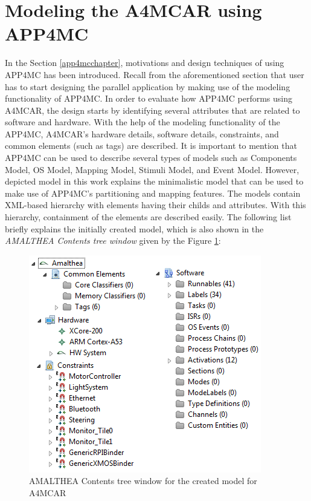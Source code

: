 \section{Modeling the A4MCAR using APP4MC}
In the Section \ref{app4mcchapter}, motivations and design techniques of using APP4MC has been introduced. Recall from the aforementioned section that user has to start designing the parallel application by making use of the modeling functionality of APP4MC. In order to evaluate how APP4MC performs using A4MCAR, the design starts by identifying several attributes that are related to software and hardware. With the help of the modeling functionality of the APP4MC, A4MCAR's hardware details, software details, constraints, and common elements (such as tags) are described. It is important to mention that APP4MC can be used to describe several types of models such as Components Model, OS Model, Mapping Model, Stimuli Model, and Event Model. However, depicted model in this work explains the minimalistic model that can be used to make use of APP4MC's partitioning and mapping features. The models contain XML-based hierarchy with elements having their childs and attributes. With this hierarchy, containment of the elements are described easily. The following list briefly explains the initially created model, which is also shown in the \textit{AMALTHEA Contents tree window} given by the Figure \ref{fig:overallmodel}:
\begin{figure}[!ht]
	\centering
	\captionsetup{justification=centering}
	\includegraphics[scale=0.8]{content/images/overallmodel.png}
	\caption{AMALTHEA Contents tree window for the created model for A4MCAR}
	\label{fig:overallmodel}
\end{figure}
